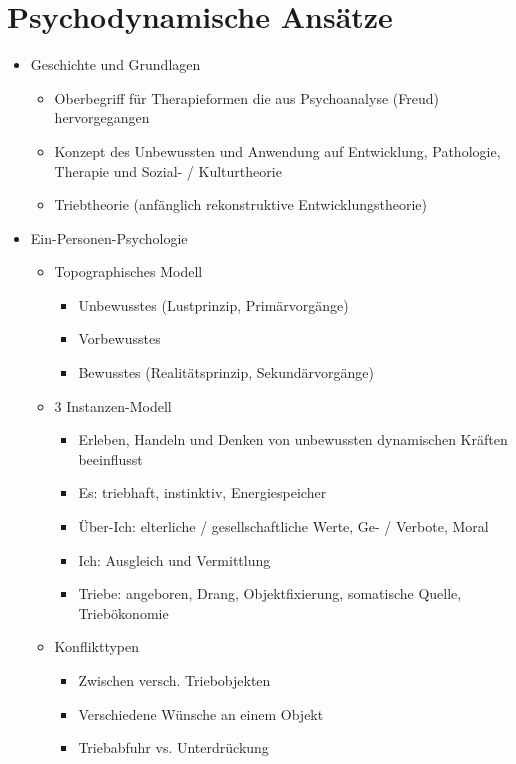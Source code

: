 \documentclass[11pt, paper=a4, twocolumn]{scrartcl}
\begin{document}
	\section{Psychodynamische Ansätze}
		\begin{itemize}
			\item Geschichte und Grundlagen
				\begin{itemize}
					\item Oberbegriff für Therapieformen die aus Psychoanalyse (Freud) hervorgegangen
					\item Konzept des Unbewussten und Anwendung auf Entwicklung, Pathologie, Therapie und Sozial- / Kulturtheorie
					\item Triebtheorie (anfänglich rekonstruktive Entwicklungstheorie)
				\end{itemize}
			\item Ein-Personen-Psychologie 
				\begin{itemize}
					\item Topographisches Modell
						\begin{itemize}
							\item Unbewusstes (Lustprinzip, Primärvorgänge)
							\item Vorbewusstes
							\item Bewusstes (Realitätsprinzip, Sekundärvorgänge)
						\end{itemize}
					\item 3 Instanzen-Modell
						\begin{itemize}
							\item Erleben, Handeln und Denken von unbewussten dynamischen Kräften beeinflusst
							\item Es: triebhaft, instinktiv, Energiespeicher
							\item Über-Ich: elterliche / gesellschaftliche Werte, Ge- / Verbote, Moral
							\item Ich: Ausgleich und Vermittlung
							\item Triebe: angeboren, Drang, Objektfixierung, somatische Quelle, Triebökonomie
						\end{itemize}
					\item Konflikttypen
						\begin{itemize}
							\item Zwischen versch. Triebobjekten
							\item Verschiedene Wünsche an einem Objekt
							\item Triebabfuhr vs. Unterdrückung
						\end{itemize}

\end{itemize}
\end{itemize}
\end{document}
